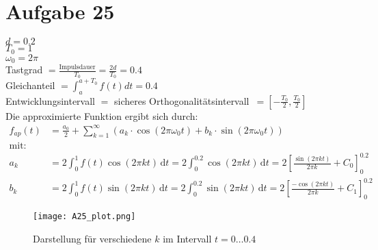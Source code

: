 

	\section*{Aufgabe 25}
		$d = 0.2$\\
		$T_0 = 1$\\
		$\omega_0 = 2\pi$\\
		Tastgrad $= \frac{\text{Impulsdauer}}{T_0} = \frac{2d}{T_0} = 0.4$\\
		Gleichanteil $= \int_{a}^{a+T_0} f(t) dt = 0.4$\\
		Entwicklungsintervall $=$ \glqq sicheres Orthogonalitätsintervall\grqq\ $= \left[-\frac{T_0}{2},\frac{T_0}{2}\right]$\\
        Die approximierte Funktion ergibt sich durch:
        \begin{align*}
            f_{ap}(t) &= \frac{a_0}{2} + \sum_{k=1}^\infty \left(a_k \cdot \cos(2\pi \omega_0 t) + b_k \cdot \sin(2\pi \omega_0 t)\right) \\
            \text{mit:} \\
            a_k &= 2 \int_{0}^{1} f(t) \cos(2\pi k t) \, \text{d}t = 2 \int_{0}^{0.2} \cos(2\pi k t) \, \text{d}t = 2 \left[ \frac{\sin(2\pi k t)}{2\pi k} + C_0 \right]_0^{0.2} \\
            b_k &= 2 \int_{0}^{1} f(t) \sin(2\pi k t) \, \text{d}t = 2 \int_{0}^{0.2} \sin(2\pi k t) \, \text{d}t = 2 \left[ \frac{-\cos(2\pi k t)}{2\pi k} + C_1 \right]_0^{0.2}
        \end{align*}
        \begin{figure}
            \texttt{[image: A25\_plot.png]}
            \caption{Darstellung für verschiedene $k$ im Intervall $t = 0 \dots 0.4$}
        \end{figure}

